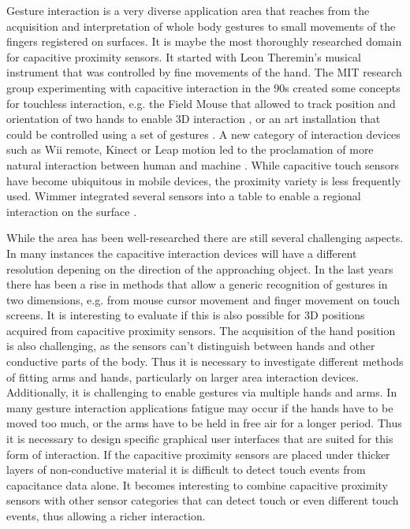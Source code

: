 Gesture interaction is a very diverse application area that reaches from the acquisition and interpretation of whole body gestures to small movements of the fingers registered on surfaces. It is maybe the most thoroughly researched domain for capacitive proximity sensors. It started with Leon Theremin's musical instrument that was controlled by fine movements of the hand. The MIT research group experimenting with capacitive interaction in the 90s created some concepts for touchless interaction, e.g. the Field Mouse that allowed to track position and orientation of two hands to enable 3D interaction \cite{Smith1996a}, or an art installation that could be controlled using a set of gestures \cite{smith1998electric}. A new category of interaction devices such as Wii remote, Kinect or Leap motion led to the proclamation of more natural interaction between human and machine \cite{Valli2008}. While capacitive touch sensors have become ubiquitous in mobile devices, the proximity variety is less frequently used. Wimmer integrated several sensors into a table to enable a regional interaction on the surface \cite{Wimmer2006}. 

While the area has been well-researched there are still several challenging aspects. In many instances the capacitive interaction devices will have a different resolution depening on the direction of the approaching object. In the last years there has been a rise in methods that allow a generic recognition of gestures in two dimensions, e.g. from mouse cursor movement and finger movement on touch screens. It is interesting to evaluate if this is also possible for 3D positions acquired from capacitive proximity sensors. The acquisition of the hand position is also challenging, as the sensors can't distinguish between hands and other conductive parts of the body. Thus it is necessary to investigate different methods of fitting arms and hands, particularly on larger area interaction devices. Additionally, it is challenging to enable gestures via multiple hands and arms. In many gesture interaction applications fatigue may occur if the hands have to be moved too much, or the arms have to be held in free air for a longer period. Thus it is necessary to design specific graphical user interfaces that are suited for this form of interaction. If the capacitive proximity sensors are placed under thicker layers of non-conductive material it is difficult to detect touch events from capacitance data alone. It becomes interesting to combine capacitive proximity sensors with other sensor categories that can detect touch or even different touch events, thus allowing a richer interaction. 

